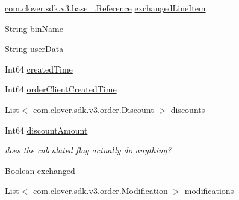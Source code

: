 \begin{DoxyCompactItemize}
\item 
\hyperlink{classcom_1_1clover_1_1sdk_1_1v3_1_1base___1_1_reference}{com.\+clover.\+sdk.\+v3.\+base\+\_\+.\+Reference} \hyperlink{classcom_1_1clover_1_1sdk_1_1v3_1_1order_1_1_line_item_a4deea9f670c4fbfe68ea9423192cfd84}{exchanged\+Line\+Item}
\item 
String \hyperlink{classcom_1_1clover_1_1sdk_1_1v3_1_1order_1_1_line_item_affc95093a64dd7cec95299968248d447}{bin\+Name}
\item 
String \hyperlink{classcom_1_1clover_1_1sdk_1_1v3_1_1order_1_1_line_item_a8d4d1f1cb89bf99aa0bbc936e137a1b8}{user\+Data}
\item 
Int64 \hyperlink{classcom_1_1clover_1_1sdk_1_1v3_1_1order_1_1_line_item_a4303cdd6593131df5dd2f1648d1f9658}{created\+Time}
\item 
Int64 \hyperlink{classcom_1_1clover_1_1sdk_1_1v3_1_1order_1_1_line_item_aa34fe449b5aff5a12f58f9fbd55a5c7f}{order\+Client\+Created\+Time}
\item 
List$<$ \hyperlink{classcom_1_1clover_1_1sdk_1_1v3_1_1order_1_1_discount}{com.\+clover.\+sdk.\+v3.\+order.\+Discount} $>$ \hyperlink{classcom_1_1clover_1_1sdk_1_1v3_1_1order_1_1_line_item_a737ffc56f0b96d031ebdbd490b9c2559}{discounts}
\item 
Int64 \hyperlink{classcom_1_1clover_1_1sdk_1_1v3_1_1order_1_1_line_item_aaf7ca9189ecde44c059eed82bcfd0c79}{discount\+Amount}
\begin{DoxyCompactList}\small\item\em does the calculated flag actually do anything? \end{DoxyCompactList}\item 
Boolean \hyperlink{classcom_1_1clover_1_1sdk_1_1v3_1_1order_1_1_line_item_a9ced72773ee611e1ccc95177a2a31f86}{exchanged}
\item 
List$<$ \hyperlink{classcom_1_1clover_1_1sdk_1_1v3_1_1order_1_1_modification}{com.\+clover.\+sdk.\+v3.\+order.\+Modification} $>$ \hyperlink{classcom_1_1clover_1_1sdk_1_1v3_1_1order_1_1_line_item_a01fe5e70f36a74a944c5d7d71b29e62a}{modifications}

\end{DoxyCompactItemize}
